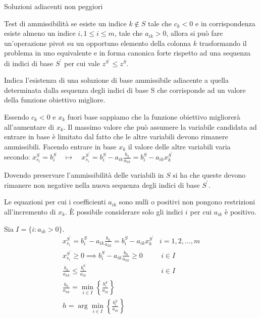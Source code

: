 \documentclass{beamer}
\begin{document}
\begin{frame}[allowframebreaks]{Soluzioni adiacenti non peggiori}
\begin{block}{ Test di ammissibilit\`a}
se esiste un indice $k \notin S$ tale che $c_k < 0$ e in corrispondenza esiste almeno un indice $i, 1 \leq i \leq m$, tale che $a_{ik} > 0$, allora si pu\`o fare un'operazione pivot su un opportuno elemento della colonna $k$ trasformando il problema in uno equivalente e in forma canonica forte rispetto ad una sequenza di indici di base $S^\prime$ per cui vale $z^{S^\prime} \leq z^S$.
\end{block}

Indica l'esistenza di una soluzione di base ammissibile adiacente a quella determinata dalla sequenza degli indici di base S che corrisponde ad un valore della funzione obiettivo migliore.

Essendo $c_k < 0$ e $x_k$ fuori base sappiamo che la funzione obiettivo migliorer\`a all'aumentare di $x_k$. Il massimo valore che pu\`o assumere la variabile candidata ad entrare in base \`e limitato dal fatto che le altre variabili devono rimanere ammissibili. Facendo entrare in base $x_k$ il valore delle altre variabili varia secondo:
$
x^S_{s_i} = b_{i}^S \quad\mapsto\quad x_{s_i}^{S^\prime}=b_i^S-a_{ik}\frac{b_h}{a_{hk}} =b_i^S-a_{ik} x^{S^\prime}_{k}
$

Dovendo preservare l'ammissibilit\`a delle variabili in $S$ si ha
che queste devono rimanere non negative nella nuova sequenza
degli indici di base $S^\prime$.

Le equazioni per cui i coefficienti $a_{ik} $ sono nulli o positivi
non pongono restrizioni all'incremento di $x_k$.
\`E possibile considerare solo gli indici $i$ per cui $a_{ik}$ \`e
positivo.

Sia $I = \{i : a_{ik} > 0\}$. 
{\small
\begin{eqnarray}
x_{s_i}^{S^\prime}=b_i^S-a_{ik}\frac{b_h}{a_{hk}} =b_i^S-a_{ik} x^{S^\prime}_{k} & i=1,2,\ldots,m \nonumber\\
x_{s_i}^{S^\prime} \geq 0 \implies b_i^S-a_{ik}\frac{b_h}{a_{hk}} \geq 0 & \ i \in I  \nonumber \\
\frac{b_h}{a_{hk}} \leq  \frac{b_i^S}{a_{ik}} & \ i \in I  \nonumber\\
\frac{b_h}{a_{hk}} = \min_{i \in I} \left\lbrace\frac{b_i^S}{a_{ik}}\right\rbrace  \nonumber\\
h = \arg\min_{i \in I} \left\lbrace\frac{b_i^S}{a_{ik}}\right\rbrace  \nonumber
\end{eqnarray}
}
\end{frame}
\end{document}
